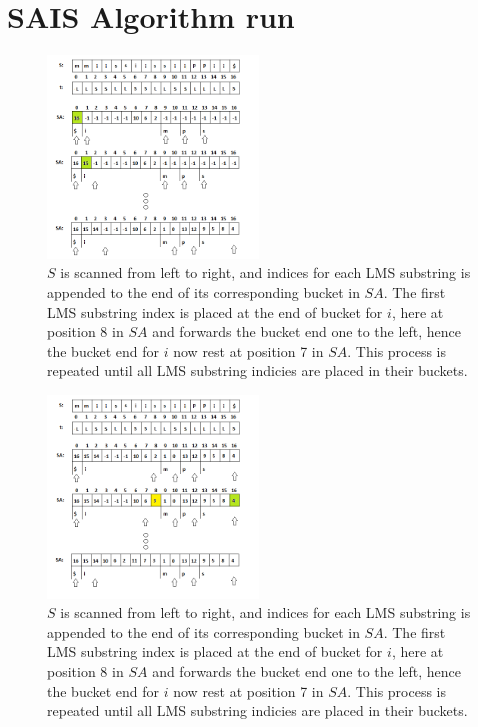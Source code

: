 \documentclass[12pt]{article} %
\begin{document}
\section{SAIS Algorithm run}\label{SAIS Algorithm run}
\begin{figure}[H]
    \centering
    \includegraphics[width=0.5\textwidth]{SAIS_LMS2}
    \captionsetup{width=0.8\textwidth}
    \caption{$S$ is scanned from left to right, and indices for each LMS substring is appended to the end of its corresponding bucket in $SA$. The first LMS substring index is placed at the end of bucket for $i$, here at position 8 in $SA$ and forwards the bucket end one to the left, hence the bucket end for $i$ now rest at position 7 in $SA$. This process is repeated until all LMS substring indicies are placed in their buckets.}
    \label{fig:SAIS_LMS2}
\end{figure}
\begin{figure}[H]
    \centering
    \includegraphics[width=0.5\textwidth]{SAIS_LMS3}
    \captionsetup{width=0.8\textwidth}
    \caption{$S$ is scanned from left to right, and indices for each LMS substring is appended to the end of its corresponding bucket in $SA$. The first LMS substring index is placed at the end of bucket for $i$, here at position 8 in $SA$ and forwards the bucket end one to the left, hence the bucket end for $i$ now rest at position 7 in $SA$. This process is repeated until all LMS substring indicies are placed in their buckets.}
    \label{fig:SAIS_LMS3}
\end{figure}
\lipsum[21]


\newpage
\nocite{*}



\end{document}
